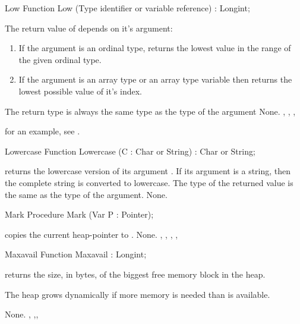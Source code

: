 \documentclass{report}
\begin{document}
\begin{function}{Low}
\Declaration
Function Low (Type identifier or variable reference) : Longint;

\Description
 The return value of  depends on it's argument:
\begin{enumerate}
\item If the argument is an ordinal type,  returns the lowest 
value in the range of the given ordinal type.
\item If the argument is an array type or an array type variable then
 returns the lowest possible value of it's index.
\end{enumerate}
The return type is always the same type as the type of the argument
\Errors
None.
\SeeAlso
{}, , , 
\end{function}
for an example, see .
\begin{function}{Lowercase}
\Declaration
Function Lowercase (C : Char or String) : Char or String;

\Description
{} returns the lowercase version of its argument .
If its argument is a string, then the complete string is converted to
lowercase. The type of the returned value is the same as the type of the
argument.
\Errors
None.
\SeeAlso
{}
\end{function}


\begin{procedure}{Mark}
\Declaration
Procedure Mark (Var P : Pointer);

\Description
{} copies the current heap-pointer to .
\Errors
None.
\SeeAlso
{}, , , , 
\end{procedure}


\begin{function}{Maxavail}
\Declaration
Function Maxavail  : Longint;

\Description
{} returns the size, in bytes, of the biggest free memory block in
the heap.
\begin{remark}
The heap grows dynamically if more memory is needed than is available.
\end{remark}
\Errors
None.
\SeeAlso
{}, ,, 
\end{function}
\end{document}

